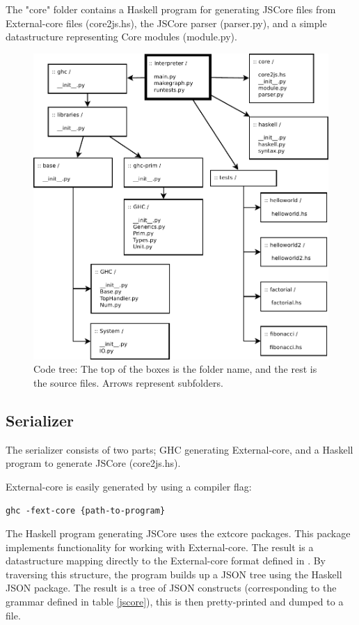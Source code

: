 The "core" folder contains a Haskell program for generating JSCore files from External-core files
(core2js.hs), the JSCore parser (parser.py), and a simple datastructure representing Core modules
(module.py).

\begin{figure}[H]
\centering
\includegraphics[width=\textwidth]{diags/organization}
\caption[Code tree: organization]{Code tree: The top of the boxes is the folder name, 
and the rest is the source files. Arrows represent subfolders.}
\label{organization}
\end{figure}

\subsection{Serializer}

The serializer consists of two parts; GHC generating External-core, and 
a Haskell program to generate JSCore (core2js.hs).

External-core is easily generated by using a compiler flag:
\begin{lstlisting}
ghc -fext-core {path-to-program}
\end{lstlisting}


The Haskell program generating JSCore uses the extcore packages. This package
implements functionality for working with External-core. The result is a datastructure
mapping directly to the External-core format defined in \cite{tolmach2010ghc}. By traversing
this structure, the program builds up a JSON tree using the Haskell JSON package.
The result is a tree of JSON constructs (corresponding to the grammar defined 
in table \ref{jscore}), this is then pretty-printed and dumped to a file.

